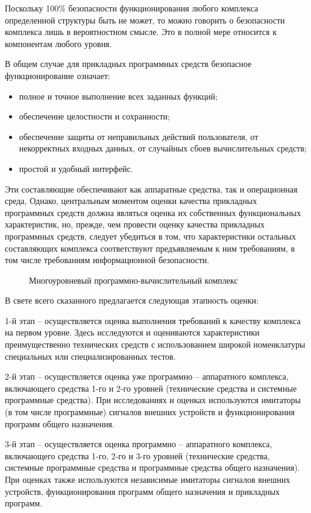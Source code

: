 Поскольку 100\% безопасности функционирования любого комплекса определенной структуры быть не может, то можно говорить о безопасности комплекса лишь в вероятностном смысле. Это в полной мере относится к компонентам любого уровня.

В общем случае для прикладных программных средств безопасное функционирование означает:

\begin{itemize}
\item полное и точное выполнение всех заданных функций;
\item обеспечение целостности и сохранности;
\item обеспечение защиты от неправильных действий пользователя, от некорректных входных данных, от случайных сбоев вычислительных средств;
\item простой и удобный интерфейс.
\end{itemize}

Эти составляющие обеспечивают как аппаратные средства, так и операционная среда, Однако, центральным моментом оценки качества прикладных программных средств должна являться оценка их собственных функциональных характеристик, но, прежде, чем провести оценку качества прикладных программных средств, следует убедиться в том, что характеристики остальных составляющих комплекса соответствуют предъявляемым к ним требованиям, в том числе требованиям информационной безопасности.

\begin{figure}[h!]
\caption{Многоуровневый программно-вычислительный комплекс}
\label{mnogour_pvk:pon1}
\end{figure}

В свете всего сказанного предлагается следующая этапность оценки:

1-й этап – осуществляется оценка выполнения требований к качеству комплекса на первом уровне. Здесь исследуются и оцениваются характеристики преимущественно технических средств с использованием широкой номенклатуры специальных или специализированных тестов.

2-й этап – осуществляется оценка уже программно – аппаратного комплекса, включающего средства 1-го и 2-го уровней (технические средства и системные программные средства). При исследованиях и оценках используются имитаторы (в том числе программные) сигналов внешних устройств и функционирования программ общего назначения.

3-й этап – осуществляется оценка программно – аппаратного комплекса, включающего средства 1-го, 2-го и 3-го уровней (технические средства, системные программные средства и программные средства общего назначения). При оценках также используются независимые имитаторы сигналов внешних устройств, функционирования программ общего назначения и прикладных программ.


